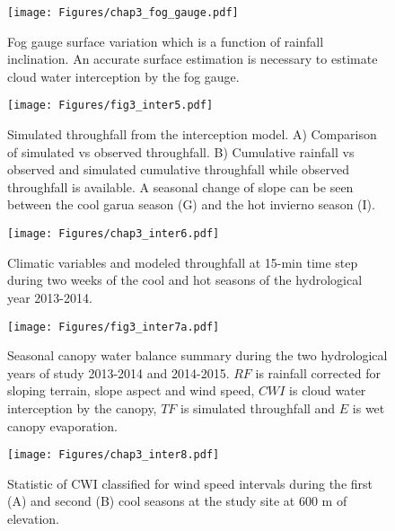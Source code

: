 \documentclass[a4paper,12pt]{article}
\begin{document}
\begin{figure}[H] \centering
  \texttt{[image: Figures/chap3\_fog\_gauge.pdf]}
  \caption[Fog gauge surface variation as a function of rainfall inclination]{Fog gauge surface variation which is a function of rainfall inclination. An accurate surface estimation is necessary to estimate cloud water interception by the fog gauge.} \label{fig3:fog_gauge} 
\end{figure}

\begin{figure}[H] \centering
  \texttt{[image: Figures/fig3\_inter5.pdf]}
  \caption[Simulated throughfall from the interception model]{Simulated throughfall from the interception model. A) Comparison of simulated vs observed throughfall. B) Cumulative rainfall vs observed and simulated cumulative throughfall while observed throughfall is available. A seasonal change of slope can be seen between the cool garua season (G) and the hot invierno season (I).} \label{fig:fog_res1} 
\end{figure}

\begin{figure}[H] \centering
  \texttt{[image: Figures/chap3\_inter6.pdf]}
  \caption[Climatic variables and modeled throughfall]{Climatic variables and modeled throughfall at 15-min time step during two weeks of the cool and hot seasons of the hydrological year 2013-2014.} \label{fig:fog_res2} 
\end{figure}

\begin{figure}[H] \centering
  \texttt{[image: Figures/fig3\_inter7a.pdf]}
  \caption[Seasonal canopy water balance summary during the two hydrological years of study]{Seasonal canopy water balance summary during the two hydrological years of study 2013-2014 and 2014-2015. $RF$ is rainfall corrected for sloping terrain, slope aspect and wind speed, $CWI$ is cloud water interception by the canopy, $TF$ is simulated throughfall and $E$ is wet canopy evaporation.} \label{fig:fog_res3} 
\end{figure}

\begin{figure}[H] \centering
  \texttt{[image: Figures/chap3\_inter8.pdf]}
  \caption[Statistics of CWI classified for wind speed intervals ]{Statistic of CWI classified for wind speed intervals during the first (A) and second (B) cool seasons at the study site at 600 m of elevation.} \label{fig:fog_res4} 
\end{figure}
\end{document}
